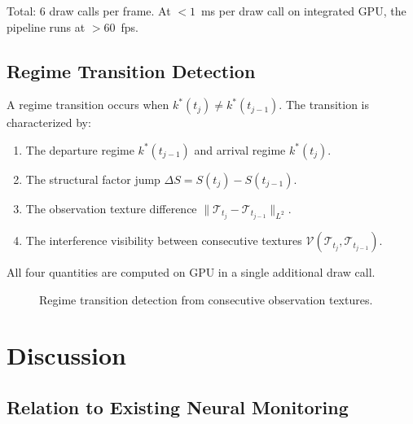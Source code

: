 \documentclass[11pt,twocolumn,a4paper]{article}
\newcommand{\Tex}{\mathcal{T}}
\begin{document}
\noindent Total: 6 draw calls per frame. At $<1$~ms per draw call on integrated GPU, the pipeline runs at $>60$~fps.

\subsection{Regime Transition Detection}

A regime transition occurs when $k^*(t_j) \neq k^*(t_{j-1})$.
The transition is characterized by:
\begin{enumerate}[leftmargin=*,itemsep=1pt]
\item The departure regime $k^*(t_{j-1})$ and arrival regime $k^*(t_j)$.
\item The structural factor jump $\Delta S = S(t_j) - S(t_{j-1})$.
\item The observation texture difference $\|\Tex_{t_j} - \Tex_{t_{j-1}}\|_{L^2}$.
\item The interference visibility between consecutive textures $\mathcal{V}(\Tex_{t_j}, \Tex_{t_{j-1}})$.
\end{enumerate}
All four quantities are computed on GPU in a single additional draw call.

\begin{figure}[t]
\centering
{}
\caption{Regime transition detection from consecutive observation textures.}
\label{fig:transition}
\end{figure}



\section{Discussion}
\label{sec:discussion}

\subsection{Relation to Existing Neural Monitoring}
\end{document}
